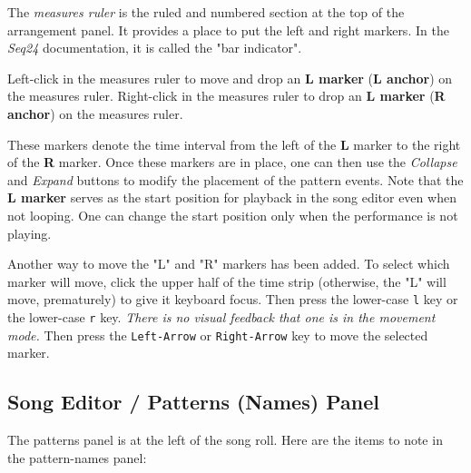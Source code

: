    The \textsl{measures ruler} is the ruled and numbered section at the top
   of the arrangement panel.  It provides a place to put the left and right
   markers.  In the \textsl{Seq24} documentation, it is called the "bar
   indicator".

   Left-click in the measures ruler to move and drop an
   \textbf{L marker} (\textbf{L anchor}) on the measures ruler.
   Right-click in the measures ruler to drop an
   \textbf{L marker} (\textbf{R anchor}) on the measures ruler.
   
   These markers denote the time interval from the left of the 
   \textbf{L} marker to the right of the \textbf{R} marker.
   Once these markers are in place, one can then use
	the \textsl{Collapse} and \textsl{Expand} buttons to modify the
   placement of the pattern events.
   Note that the \textbf{L marker} serves as the start position for playback
   in the song editor even when not looping.
   One can change the start position only when the
   performance is not playing.

   Another way to move the "L" and "R" markers has been added.
   To select which marker will move, click the upper half of the time
   strip (otherwise, the "L" will move, prematurely) to give it keyboard focus.
   Then press the lower-case
   \texttt{l} key or the lower-case
   \texttt{r} key.
   \textsl{There is no visual feedback that one is in the movement mode.}
   Then press the \texttt{Left-Arrow} or \texttt{Right-Arrow}
   key to move the selected marker.

\subsection{Song Editor / Patterns (Names) Panel}
\label{subsec:song_editor_patterns_panel}

   The patterns panel is at the left of the song roll.
   Here are the items to note in the pattern-names panel:


